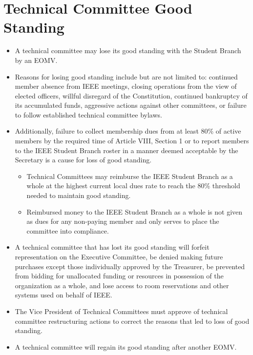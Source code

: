 \documentclass[12pt]{constitution}
\begin{document}
\section{Technical Committee Good Standing}
\label{sec:tech_goodstand}
\begin{itemize}
    \item A technical committee may lose its good standing with the Student Branch by an EOMV.
    \item Reasons for losing good standing include but are not limited to: continued member absence from IEEE meetings, closing operations from the view of elected officers, willful disregard of the Constitution, continued bankruptcy of its accumulated funds, aggressive actions against other committees, or failure to follow established technical committee bylaws.
	\item Additionally, failure to collect membership dues from at least 80\% of active members by the required time of Article VIII, Section 1 or to report members to the IEEE Student Branch roster in a manner deemed acceptable by the Secretary is a cause for loss of good standing.
	\begin{itemize}
		\item Technical Committees may reimburse the IEEE Student Branch as a whole at the highest current local dues rate to reach the 80\% threshold needed to maintain good standing.
		\item Reimbursed money to the IEEE Student Branch as a whole is not given as dues for any non-paying member and only serves to place the committee into compliance.
	\end{itemize}
    \item A technical committee that has lost its good standing will forfeit representation on the Executive Committee, be denied making future purchases except those individually approved by the Treasurer, be prevented from bidding for unallocated funding or resources in possession of the organization as a whole, and lose access to room reservations and other systems used on behalf of IEEE.
    \item The Vice President of Technical Committees must approve of technical committee restructuring actions to correct the reasons that led to loss of good standing.
    \item A technical committee will regain its good standing after another EOMV.
\end{itemize}
\end{document}

